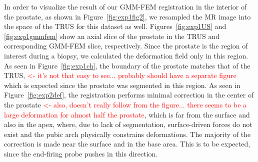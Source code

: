 \documentclass[journal]{IEEEtran}
\newcommand{\comment}[1]{\textcolor{red}{#1}}
\begin{document}
In order to visualize the result of our GMM-FEM registration in the interior of the prostate, as shown in Figure~\ref{fig:exp1fig2}, we resampled the MR image into the space of the TRUS for this dataset as well. Figures~\ref{fig:exp1US} and \ref{fig:exp1gmmfem} show an axial slice of the prostate in the TRUS and corresponding GMM-FEM slice, respectively. Since the prostate is the region of interest during a biopsy, we calculated the deformation field only in this region. As seen in Figure~\ref{fig:exp1ch}, the boundary of the prostate matches that of the TRUS, \comment{<- it's not that easy to see... probably should have a separate figure} which is expected since the prostate was segmented in this region. As seen in Figure~\ref{fig:exp2def}, the registration performs minimal correction in the center of the prostate \comment{<- also, doesn't really follow from the figure... there seems to be a large deformation for almost half the prostate}, which is far from the surface and also in the apex, where, due to lack of segmentation, surface-driven forces do not exist and the pubic arch physically constrains deformations. The majority of the correction is made near the surface and in the base area. This is to be expected, since the end-firing probe pushes in this direction.
\end{document}
